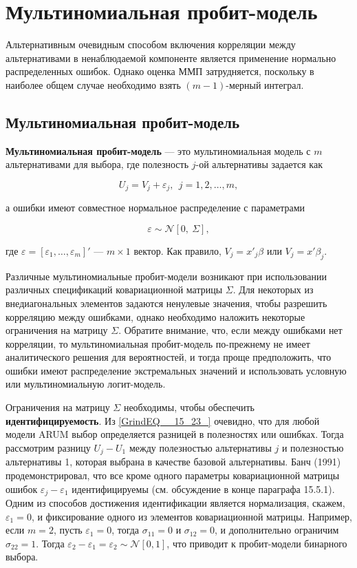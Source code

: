 \section{Мультиномиальная пробит-модель}

Альтернативным очевидным способом включения корреляции между альтернативами в ненаблюдаемой компоненте является применение нормально распределенных ошибок. Однако оценка ММП затрудняется, поскольку в наиболее общем случае необходимо взять $(m-1)$-мерный интеграл.

\subsection{Мультиномиальная пробит-модель}

\textbf{Мультиномиальная пробит-модель } --- это мультиномиальная модель с $m$ альтернативами для выбора, где полезность $j$-ой альтернативы задается как

\begin{equation} \label{GrindEQ__15_45_} U_j=V_j+{\varepsilon }_j,\ \ j=1,2,\dots ,m, \end{equation} 

а ошибки имеют совместное нормальное распределение с параметрами

\begin{equation} \label{GrindEQ__15_46_} \varepsilon \sim {\mathcal N}\left[0,\ \Sigma \right], \end{equation} 

где $\varepsilon =[{\varepsilon }_1,\dots ,{\varepsilon }_m]'$ --- $m\times 1$ вектор. Как правило, $V_j=x'_j\beta $ или $V_j=x'{\beta }_j$.

Различные мультиномиальные пробит-модели возникают при использовании различных спецификаций ковариационной матрицы $\Sigma $. Для некоторых из внедиагональных элементов задаются ненулевые значения, чтобы разрешить корреляцию между ошибками, однако необходимо наложить некоторые ограничения на матрицу $\Sigma $. Обратите внимание, что, если между ошибками нет корреляции, то мультиномиальная пробит-модель по-прежнему не имеет аналитического решения для вероятностей, и тогда проще предположить, что ошибки имеют  распределение экстремальных значений и использовать условную или мультиномиальную логит-модель.

Ограничения на матрицу $\Sigma $ необходимы, чтобы обеспечить \textbf{идентифицируемость}. Из \eqref{GrindEQ__15_23_} очевидно, что для любой модели ARUM выбор определяется разницей в полезностях или ошибках. Тогда рассмотрим разницу $U_j-U_1$ между полезностью альтернативы $j$ и полезностью  альтернативы 1, которая выбрана в качестве базовой альтернативы. Банч (1991)  продемонстрировал, что все кроме одного параметры ковариационной матрицы ошибок ${\varepsilon }_j-{\varepsilon }_1$ идентифицируемы (см. обсуждение в конце параграфа 15.5.1). Одним из способов достижения идентификации является нормализация, скажем, ${\varepsilon }_1=0$, и фиксирование одного из элементов ковариационной матрицы. Например, если $m=2$, пусть ${\varepsilon }_1=0$, тогда ${\sigma }_{11}=0$ и ${\sigma }_{12}=0$, и дополнительно ограничим ${\sigma }_{22}=1$. Тогда ${\varepsilon }_2-{\varepsilon }_1={\varepsilon }_2\sim {\mathcal N}[0,1]$, что приводит к пробит-модели бинарного выбора.

